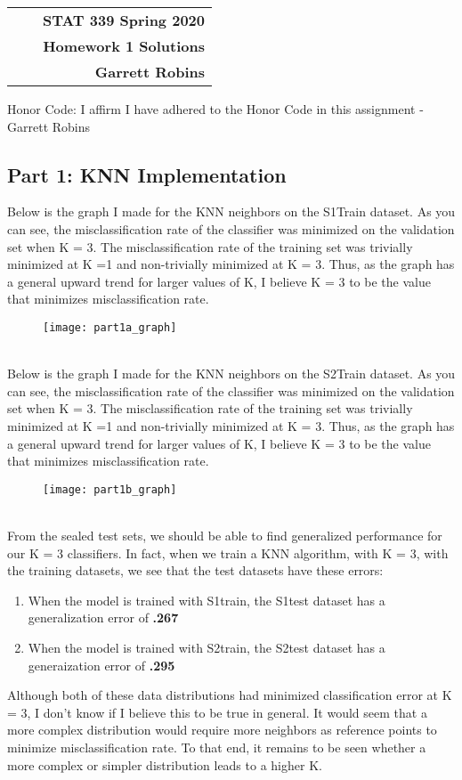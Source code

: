 \documentclass[11pt]{article}
\makeatletter
\renewcommand\maketitle{
\begin{center}
\begin{tabular*}{6.44in}{l @{\extracolsep{\fill}}c r}
\bfseries  &  & \bfseries STAT 339 Spring 2020 \\
\bfseries&  & \bfseries  Homework 1 Solutions  \\
\bfseries   &   &  \bfseries Garrett Robins \\ 
\end{tabular*}
\end{center} }
\makeatother
\begin{document}
\maketitle


\noindent Honor Code: I affirm I have adhered to the Honor Code in this assignment - Garrett Robins\\
\subsection*{Part  1: KNN Implementation}
Below is the graph I made for the KNN neighbors on the S1Train dataset. As you can see, the misclassification rate of the classifier was minimized on the validation set when K = 3. The misclassification rate of the training set was trivially minimized at K =1 and non-trivially minimized at K = 3. Thus, as the graph has a general upward trend for larger values of K, I believe K = 3 to be the value that minimizes misclassification rate. 
\begin{figure}[h!]
\texttt{[image: part1a\_graph]}
\centering
\end{figure} \\

Below is the graph I made for the KNN neighbors on the S2Train dataset. As you can see, the misclassification rate of the classifier was minimized on the validation set when K = 3. The misclassification rate of the training set was trivially minimized at K =1 and non-trivially minimized at K = 3. Thus, as the graph has a general upward trend for larger values of K, I believe K = 3 to be the value that minimizes misclassification rate. 
\begin{figure}[h!]
\texttt{[image: part1b\_graph]}
\centering
\end{figure} \\

From the sealed test sets, we should be able to find generalized performance for our K = 3 classifiers. In fact, when we train a KNN algorithm, with K = 3, with the training datasets, we see that the test datasets have these errors: \\
\begin{enumerate}
\item When the model is trained with S1train, the S1test dataset has a generalization error of {\bf .267}
\item When the model is trained with S2train, the S2test dataset has a generaization error of {\bf .295}
\end{enumerate} 
Although both of these data distributions had minimized classification error at K = 3, I don't know if I believe this to be true in general. It would seem that a more complex distribution would require more neighbors as reference points to minimize misclassification rate. To that end, it remains to be seen whether a more complex or simpler distribution leads to a higher K. \\ 
\end{document}
